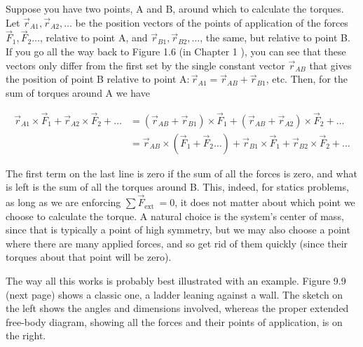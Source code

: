 \documentclass[10pt]{article}
\begin{document}
Suppose you have two points, A and B, around which to calculate the torques. Let $\vec{r}_{A 1}, \vec{r}_{A 2}, \ldots$ be the position vectors of the points of application of the forces $\vec{F}_{1}, \vec{F}_{2} \ldots$, relative to point A, and $\vec{r}_{B 1}, \vec{r}_{B 2}, \ldots$, the same, but relative to point B. If you go all the way back to Figure 1.6 (in Chapter 1 ), you can see that these vectors only differ from the first set by the single constant vector $\vec{r}_{A B}$ that gives the position of point B relative to point $\mathrm{A}: \vec{r}_{A 1}=\vec{r}_{A B}+\vec{r}_{B 1}$, etc. Then, for the sum of torques around A we have


\begin{align*}
\vec{r}_{A 1} \times \vec{F}_{1}+\vec{r}_{A 2} \times \vec{F}_{2}+\ldots & =\left(\vec{r}_{A B}+\vec{r}_{B 1}\right) \times \vec{F}_{1}+\left(\vec{r}_{A B}+\vec{r}_{A 2}\right) \times \vec{F}_{2}+\ldots \\
& =\vec{r}_{A B} \times\left(\vec{F}_{1}+\vec{F}_{2} \ldots\right)+\vec{r}_{B 1} \times \vec{F}_{1}+\vec{r}_{B 2} \times \vec{F}_{2}+\ldots \tag{9.28}
\end{align*}


The first term on the last line is zero if the sum of all the forces is zero, and what is left is the sum of all the torques around B. This, indeed, for statics problems, as long as we are enforcing $\sum \vec{F}_{\text {ext }}=0$, it does not matter about which point we choose to calculate the torque. A natural choice is the system's center of mass, since that is typically a point of high symmetry, but we may also choose a point where there are many applied forces, and so get rid of them quickly (since their torques about that point will be zero).

The way all this works is probably best illustrated with an example. Figure 9.9 (next page) shows a classic one, a ladder leaning against a wall. The sketch on the left shows the angles and dimensions involved, whereas the proper extended free-body diagram, showing all the forces and their points of application, is on the right.
\end{document}

